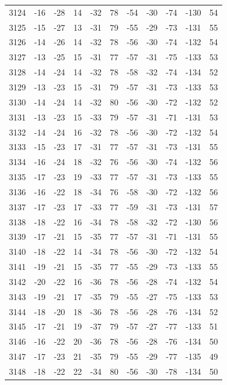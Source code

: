 \begin{table}[H]
\begin{tabular}{lllllllllll}
3124 & -16 & -28 & 14 & -32 & 78 & -54 & -30 & -74 & -130 & 54 \\
3125 & -15 & -27 & 13 & -31 & 79 & -55 & -29 & -73 & -131 & 55 \\
3126 & -14 & -26 & 14 & -32 & 78 & -56 & -30 & -74 & -132 & 54 \\
3127 & -13 & -25 & 15 & -31 & 77 & -57 & -31 & -75 & -133 & 53 \\
3128 & -14 & -24 & 14 & -32 & 78 & -58 & -32 & -74 & -134 & 52 \\
3129 & -13 & -23 & 15 & -31 & 79 & -57 & -31 & -73 & -133 & 53 \\
3130 & -14 & -24 & 14 & -32 & 80 & -56 & -30 & -72 & -132 & 52 \\
3131 & -13 & -23 & 15 & -33 & 79 & -57 & -31 & -71 & -131 & 53 \\
3132 & -14 & -24 & 16 & -32 & 78 & -56 & -30 & -72 & -132 & 54 \\
3133 & -15 & -23 & 17 & -31 & 77 & -57 & -31 & -73 & -131 & 55 \\
3134 & -16 & -24 & 18 & -32 & 76 & -56 & -30 & -74 & -132 & 56 \\
3135 & -17 & -23 & 19 & -33 & 77 & -57 & -31 & -73 & -133 & 55 \\
3136 & -16 & -22 & 18 & -34 & 76 & -58 & -30 & -72 & -132 & 56 \\
3137 & -17 & -23 & 17 & -33 & 77 & -59 & -31 & -73 & -131 & 57 \\
3138 & -18 & -22 & 16 & -34 & 78 & -58 & -32 & -72 & -130 & 56 \\
3139 & -17 & -21 & 15 & -35 & 77 & -57 & -31 & -71 & -131 & 55 \\
3140 & -18 & -22 & 14 & -34 & 78 & -56 & -30 & -72 & -132 & 54 \\
3141 & -19 & -21 & 15 & -35 & 77 & -55 & -29 & -73 & -133 & 55 \\
3142 & -20 & -22 & 16 & -36 & 78 & -56 & -28 & -74 & -132 & 54 \\
3143 & -19 & -21 & 17 & -35 & 79 & -55 & -27 & -75 & -133 & 53 \\
3144 & -18 & -20 & 18 & -36 & 78 & -56 & -28 & -76 & -134 & 52 \\
3145 & -17 & -21 & 19 & -37 & 79 & -57 & -27 & -77 & -133 & 51 \\
3146 & -16 & -22 & 20 & -36 & 78 & -56 & -28 & -76 & -134 & 50 \\
3147 & -17 & -23 & 21 & -35 & 79 & -55 & -29 & -77 & -135 & 49 \\
3148 & -18 & -22 & 22 & -34 & 80 & -56 & -30 & -78 & -134 & 50 \\

\end{tabular}
\end{table}
